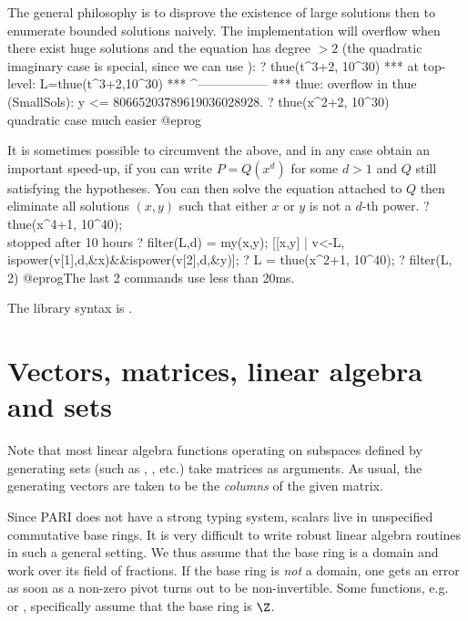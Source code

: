  The general philosophy is to disprove the existence of large
solutions then to enumerate bounded solutions naively. The implementation
will overflow when there exist huge solutions and the equation has degree
$> 2$ (the quadratic imaginary case is special, since we can use
):
\bprog
? thue(t^3+2, 10^30)
 ***   at top-level: L=thue(t^3+2,10^30)
 ***                   ^-----------------
 *** thue: overflow in thue (SmallSols): y <= 80665203789619036028928.
? thue(x^2+2, 10^30)  \\ quadratic case much easier
@eprog

 It is sometimes possible to circumvent the above, and in any
case obtain an important speed-up, if you can write $P = Q(x^d)$ for some $d >
1$ and $Q$ still satisfying the  hypotheses. You can then solve
the equation attached to $Q$ then eliminate all solutions $(x,y)$ such that
either $x$ or $y$ is not a $d$-th power.
\bprog
? thue(x^4+1, 10^40); \\ stopped after 10 hours
? filter(L,d) =
    my(x,y); [[x,y] | v<-L, ispower(v[1],d,&x)&&ispower(v[2],d,&y)];
? L = thue(x^2+1, 10^40);
? filter(L, 2)
@eprog\noindent The last 2 commands use less than 20ms.

The library syntax is .

\section{Vectors, matrices, linear algebra and sets}
\label{se:linear_algebra}

Note that most linear algebra functions operating on subspaces defined by
generating sets (such as , , etc.) take matrices as
arguments. As usual, the generating vectors are taken to be the
\emph{columns} of the given matrix.

Since PARI does not have a strong typing system, scalars live in
unspecified commutative base rings. It is very difficult to write
robust linear algebra routines in such a general setting. We thus
assume that the base ring is a domain and work over its field of
fractions. If the base ring is \emph{not} a domain, one gets an error as soon
as a non-zero pivot turns out to be non-invertible. Some functions,
e.g.~ or , specifically assume that the base ring is
$\Z$.


